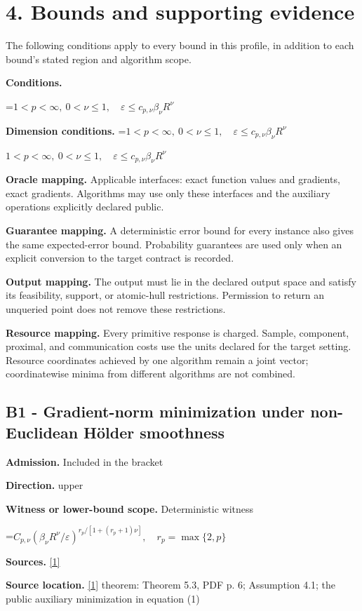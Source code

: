 \documentclass[10pt,a4paper]{article}
\newcommand{\AtlasMath}[1]{\par\begingroup\centering\setbox0=\hbox{$\displaystyle #1$}\ifdim\wd0>1.4\linewidth\typeout{ATLAS WIDE FORMULA: \the\wd0}\fi\ifdim\wd0>\linewidth\resizebox{\linewidth}{!}{\box0}\else\box0\fi\par\endgroup}
\newcommand{\AtlasInlineMath}[1]{\begingroup\setbox0=\hbox{$#1$}\ifdim\wd0>.4\linewidth\endgroup\AtlasMath{#1}\else\endgroup$#1$\fi}
\begin{document}
\section{4. Bounds and supporting evidence}
The following conditions apply to every bound in this profile, in addition to each bound's stated region and algorithm scope.

\textbf{Conditions.} 
\AtlasMath{1<p<\infty,\ 0<\nu\le1,\quad\varepsilon\le c_{p,\nu}\beta_\nu R^\nu}


\textbf{Dimension conditions.} \AtlasInlineMath{1<p<\infty,\ 0<\nu\le1,\quad\varepsilon\le c_{p,\nu}\beta_\nu R^\nu}

\textbf{Oracle mapping.} Applicable interfaces: exact function values and gradients, exact gradients. Algorithms may use only these interfaces and the auxiliary operations explicitly declared public.

\textbf{Guarantee mapping.} A deterministic error bound for every instance also gives the same expected-error bound. Probability guarantees are used only when an explicit conversion to the target contract is recorded.

\textbf{Output mapping.} The output must lie in the declared output space and satisfy its feasibility, support, or atomic-hull restrictions. Permission to return an unqueried point does not remove these restrictions.

\textbf{Resource mapping.} Every primitive response is charged. Sample, component, proximal, and communication costs use the units declared for the target setting. Resource coordinates achieved by one algorithm remain a joint vector; coordinatewise minima from different algorithms are not combined.

\subsection{B1 - Gradient-norm minimization under non-Euclidean Hölder smoothness}
\textbf{Admission.} Included in the bracket

\textbf{Direction.} upper

\textbf{Witness or lower-bound scope.} Deterministic witness

\AtlasMath{C_{p,\nu}(\beta_\nu R^\nu/\varepsilon)^{r_p/[1+(r_p+1)\nu]},\quad r_p=\max\{2,p\}}
\textbf{Sources.} \href{https://arxiv.org/pdf/2609.01122}{[1]}

\textbf{Source location.} \href{https://arxiv.org/pdf/2609.01122}{[1]} theorem: Theorem 5.3, PDF p. 6; Assumption 4.1; the public auxiliary minimization in equation (1)
\end{document}
